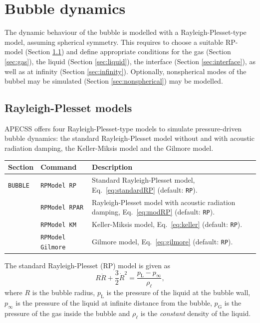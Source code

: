 \chapter{Bubble dynamics}

The dynamic behaviour of the bubble is modelled with a Rayleigh-Plesset-type model, assuming spherical symmetry. This requires to choose a suitable RP-model (Section \ref{sec:rpmodels}) and define appropriate conditions for the gas  (Section \ref{sec:gas}), the liquid (Section \ref{sec:liquid}), the interface (Section \ref{sec:interface}), as well as at infinity (Section \ref{sec:infinity}). Optionally, nonspherical modes of the bubbel may be simulated (Section \ref{sec:nonspherical}) may be modelled.

\section{Rayleigh-Plesset models}
\label{sec:rpmodels}

APECSS offers four Rayleigh-Plesset-type models to simulate pressure-driven bubble dynamics: the standard Rayleigh-Plesset model without and with acoustic radiation damping, the Keller-Miksis model and the Gilmore model.

\vspace{0.8em}

\noindent
\begin{tabular}{p{} p{} p{}}
    \textbf{Section} &\textbf{Command} & \textbf{Description} 
\vspace{1mm} \\ \hline
{\tt BUBBLE} & {\tt RPModel RP} & Standard Rayleigh-Plesset model, Eq.~\eqref{eq:standardRP} (default: {\tt RP}).\\ 
 & {\tt RPModel RPAR} & Rayleigh-Plesset model with acoustic radiation damping, Eq.~\eqref{eq:modRP} (default: {\tt RP}).\\ 
 & {\tt RPModel KM} & Keller-Miksis model, Eq.~\eqref{eq:keller} (default: {\tt RP}).\\ 
 & {\tt RPModel Gilmore} & Gilmore model, Eq.~\eqref{eq:gilmore} (default: {\tt RP}).\\ 
 \hline
\end{tabular} \vspace{1em}

\noindent The standard Rayleigh-Plesset (RP) model is given as \citep{Lauterborn2010}
\begin{equation}
R \ddot{R} + \frac{3}{2} \dot{R}^2 = \frac{p_\text{L} - p_\infty}{\rho_\ell},
\label{eq:standardRP}
\end{equation}
where $R$ is the bubble radius, $p_\text{L}$ is the pressure of the liquid at the bubble wall, $p_\infty$ is the pressure of the liquid at infinite distance from the bubble, $p_\text{G}$ is the pressure of the gas inside the bubble and $\rho_\ell$ is the {\em constant} density of the liquid.

